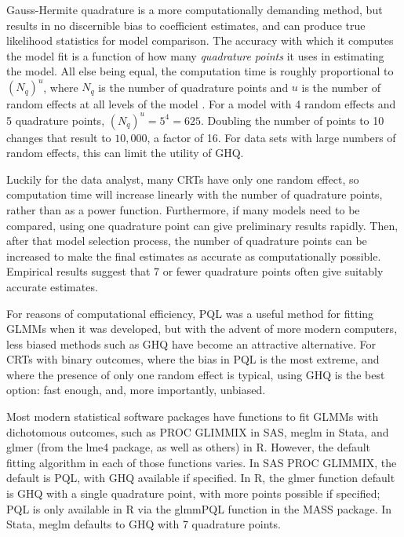 \documentclass[Afour,times,sagev,doublespace]{sagej}
\begin{document}
Gauss-Hermite quadrature is a more computationally demanding method, but results in no discernible bias to coefficient estimates, and can produce true likelihood statistics for model comparison. The accuracy with which it computes the model fit is a function of how many \textit{quadrature points} it uses in estimating the model. All else being equal, the computation time is roughly proportional to $(N_q)^u$, where $N_q$ is the number of quadrature points and $u$ is the number of random effects at all levels of the model \cite{statacorp_stata_2017}\cite{pinheiro_efficient_2006}. For a model with 4 random effects and 5 quadrature points, $(N_q)^u = 5^4 = 625$. Doubling the number of points to 10 changes that result to $10,000$, a factor of 16. For data sets with large numbers of random effects, this can limit the utility of GHQ.

Luckily for the data analyst, many CRTs have only one random effect, so computation time will increase linearly with the number of quadrature points, rather than as a power function. Furthermore, if many models need to be compared, using one quadrature point can give preliminary results rapidly. Then, after that model selection process, the number of quadrature points can be increased to make the final estimates as accurate as computationally possible. Empirical results suggest that 7 or fewer quadrature points often give suitably accurate estimates\cite{pinheiro_approximations_1995}.

For reasons of computational efficiency, PQL was a useful method for fitting GLMMs when it was developed, but with the advent of more modern computers, less biased methods such as GHQ have become an attractive alternative. For CRTs with binary outcomes, where the bias in PQL is the most extreme\cite{ng_estimation_2006}\cite{lin_estimation_2007}, and where the presence of only one random effect is typical, using GHQ is the best option: fast enough, and, more importantly, unbiased.

Most modern statistical software packages have functions to fit GLMMs with dichotomous outcomes, such as PROC GLIMMIX in SAS, meglm in Stata, and glmer (from the lme4 package, as well as others) in R. However, the default fitting algorithm in each of those functions varies. In SAS PROC GLIMMIX, the default is PQL, with GHQ available if specified. In R, the glmer function default is GHQ with a single quadrature point, with more points possible if specified; PQL is only available in R via the glmmPQL function in the MASS package. In Stata, meglm defaults to GHQ with 7 quadrature points.
\end{document}
